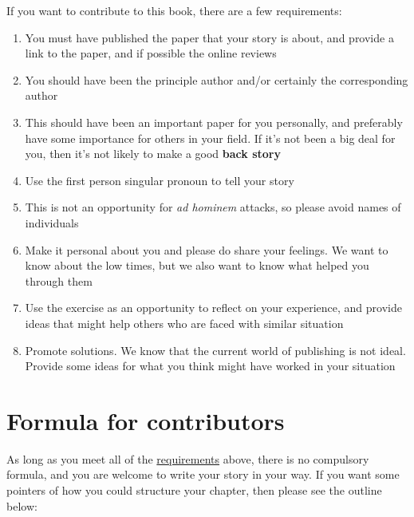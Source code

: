 \documentclass[
]{krantz}
\begin{document}
If you want to contribute to this book, there are a few requirements:

\begin{enumerate}
\def\labelenumi{\arabic{enumi}.}
\item
  You must have published the paper that your story is about, and
  provide a link to the paper, and if possible the online reviews
\item
  You should have been the principle author and/or certainly the
  corresponding author
\item
  This should have been an important paper for you personally, and
  preferably have some importance for others in your field. If it's
  not been a big deal for you, then it's not likely to make a good
  \textbf{back story}
\item
  Use the first person singular pronoun to tell your story
\item
  This is not an opportunity for \emph{ad hominem} attacks, so please avoid
  names of individuals
\item
  Make it personal about you and please do share your feelings. We
  want to know about the low times, but we also want to know what
  helped you through them
\item
  Use the exercise as an opportunity to reflect on your experience,
  and provide ideas that might help others who are faced with similar
  situation
\item
  Promote solutions. We know that the current world of publishing is
  not ideal. Provide some ideas for what you think might have worked
  in your situation
\end{enumerate}

\hypertarget{formula-for-contributors}{%
\chapter*{Formula for contributors}\label{formula-for-contributors}}


As long as you meet all of the \protect\hyperlink{requirements}{requirements} above,
there is no compulsory formula, and you are welcome to write your story
in your way. If you want some pointers of how you could structure your
chapter, then please see the outline below:
\end{document}
